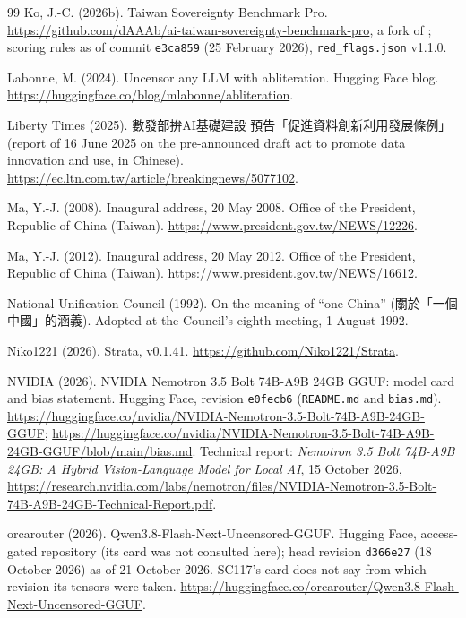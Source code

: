 \documentclass[11pt,a4paper]{article}
\newcommand{\zht}[1]{#1}
\begin{document}
\begin{thebibliography}{99}
Ko, J.-C. (2026b).
\newblock Taiwan Sovereignty Benchmark Pro.
\newblock \url{https://github.com/dAAAb/ai-taiwan-sovereignty-benchmark-pro}, a fork of \citet{hsiaoa2026tsb}; scoring
rules as of commit \texttt{e3ca859} (25 February 2026), \texttt{red\_flags.json} v1.1.0.

Labonne, M. (2024).
\newblock Uncensor any {LLM} with abliteration.
\newblock Hugging Face blog. \url{https://huggingface.co/blog/mlabonne/abliteration}.

Liberty Times (2025).
\newblock \zht{數發部拚AI基礎建設 預告「促進資料創新利用發展條例」} (report of 16 June 2025 on the pre-announced draft
act to promote data innovation and use, in Chinese).
\newblock \url{https://ec.ltn.com.tw/article/breakingnews/5077102}.

Ma, Y.-J. (2008).
\newblock Inaugural address, 20 May 2008. Office of the President, Republic of China (Taiwan).
\newblock \url{https://www.president.gov.tw/NEWS/12226}.

Ma, Y.-J. (2012).
\newblock Inaugural address, 20 May 2012. Office of the President, Republic of China (Taiwan).
\newblock \url{https://www.president.gov.tw/NEWS/16612}.

National Unification Council (1992).
\newblock On the meaning of ``one China'' (\zht{關於「一個中國」的涵義}).
\newblock Adopted at the Council's eighth meeting, 1 August 1992.

Niko1221 (2026).
\newblock Strata, v0.1.41.
\newblock \url{https://github.com/Niko1221/Strata}.

NVIDIA (2026).
\newblock NVIDIA Nemotron 3.5 Bolt 74B-A9B 24GB GGUF: model card and bias statement.
\newblock Hugging Face, revision \texttt{e0fecb6} (\texttt{README.md} and \texttt{bias.md}).
\newblock \url{https://huggingface.co/nvidia/NVIDIA-Nemotron-3.5-Bolt-74B-A9B-24GB-GGUF};
\url{https://huggingface.co/nvidia/NVIDIA-Nemotron-3.5-Bolt-74B-A9B-24GB-GGUF/blob/main/bias.md}. Technical report:
\emph{Nemotron 3.5 Bolt 74B-A9B 24GB: A Hybrid Vision-Language Model for Local AI}, 15 October 2026,
\url{https://research.nvidia.com/labs/nemotron/files/NVIDIA-Nemotron-3.5-Bolt-74B-A9B-24GB-Technical-Report.pdf}.

orcarouter (2026).
\newblock Qwen3.8-Flash-Next-Uncensored-GGUF.
\newblock Hugging Face, access-gated repository (its card was not consulted here); head revision \texttt{d366e27}
(18 October 2026) as of 21 October 2026. SC117's card does not say from which revision its tensors were taken.
\newblock \url{https://huggingface.co/orcarouter/Qwen3.8-Flash-Next-Uncensored-GGUF}.


\end{thebibliography}
\end{document}
